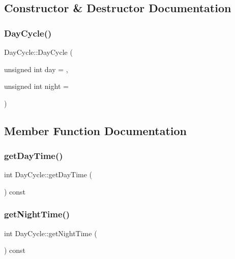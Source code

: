 \subsection{Constructor \& Destructor Documentation}
\mbox{\label{classDayCycle_a9a2d185823b938e0ff6a74d21b5225a5_a9a2d185823b938e0ff6a74d21b5225a5}} 
\subsubsection{\texorpdfstring{Day\+Cycle()}{DayCycle()}}
{\footnotesize\ttfamily Day\+Cycle\+::\+Day\+Cycle (\begin{DoxyParamCaption}\item[{unsigned int}]{day = {},  }\item[{unsigned int}]{night = {} }\end{DoxyParamCaption})}



\subsection{Member Function Documentation}
\mbox{\label{classDayCycle_a9bd40be57103509887314494419c7f1b_a9bd40be57103509887314494419c7f1b}} 
\subsubsection{\texorpdfstring{get\+Day\+Time()}{getDayTime()}}
{\footnotesize\ttfamily int Day\+Cycle\+::get\+Day\+Time (\begin{DoxyParamCaption}{ }\end{DoxyParamCaption}) const}

\mbox{\label{classDayCycle_aeeb7012fe96467e4a179a195e8851d82_aeeb7012fe96467e4a179a195e8851d82}} 
\subsubsection{\texorpdfstring{get\+Night\+Time()}{getNightTime()}}
{\footnotesize\ttfamily int Day\+Cycle\+::get\+Night\+Time (\begin{DoxyParamCaption}{ }\end{DoxyParamCaption}) const}


